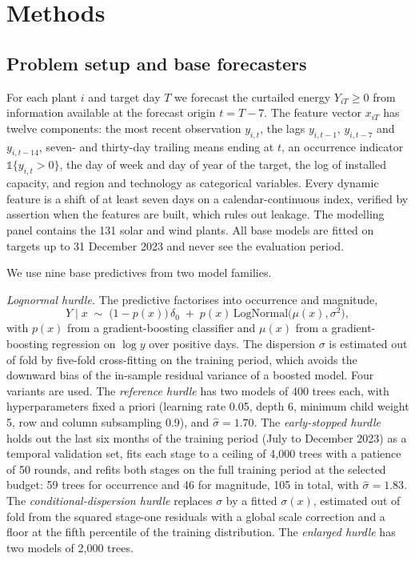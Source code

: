 

\section{Methods}
\label{sec:methods}

\subsection{Problem setup and base forecasters}
\label{sec:base}

For each plant $i$ and target day $T$ we forecast the curtailed energy $Y_{iT}\ge 0$ from information available at the forecast origin $t=T-7$. The feature vector $x_{iT}$ has twelve components: the most recent observation $y_{i,t}$, the lags $y_{i,t-1}$, $y_{i,t-7}$ and $y_{i,t-14}$, seven- and thirty-day trailing means ending at $t$, an occurrence indicator $\mathbb{1}\{y_{i,t}>0\}$, the day of week and day of year of the target, the log of installed capacity, and region and technology as categorical variables. Every dynamic feature is a shift of at least seven days on a calendar-continuous index, verified by assertion when the features are built, which rules out leakage. The modelling panel contains the 131 solar and wind plants. All base models are fitted on targets up to 31 December 2023 and never see the evaluation period.

We use nine base predictives from two model families.

\emph{Lognormal hurdle.} The predictive factorises into occurrence and magnitude,
\begin{equation}
Y \mid x \;\sim\; \big(1-p(x)\big)\,\delta_0 \;+\; p(x)\,\mathrm{LogNormal}\big(\mu(x),\sigma^2\big),
\label{eq:hurdle}
\end{equation}
with $p(x)$ from a gradient-boosting classifier and $\mu(x)$ from a gradient-boosting regression on $\log y$ over positive days. The dispersion $\sigma$ is estimated out of fold by five-fold cross-fitting on the training period, which avoids the downward bias of the in-sample residual variance of a boosted model. Four variants are used. The \emph{reference hurdle} has two models of 400 trees each, with hyperparameters fixed a priori (learning rate 0.05, depth 6, minimum child weight 5, row and column subsampling 0.9), and $\hat\sigma=1.70$. The \emph{early-stopped hurdle} holds out the last six months of the training period (July to December 2023) as a temporal validation set, fits each stage to a ceiling of 4{,}000 trees with a patience of 50 rounds, and refits both stages on the full training period at the selected budget: 59 trees for occurrence and 46 for magnitude, 105 in total, with $\hat\sigma=1.83$. The \emph{conditional-dispersion hurdle} replaces $\sigma$ by a fitted $\sigma(x)$, estimated out of fold from the squared stage-one residuals with a global scale correction and a floor at the fifth percentile of the training distribution. The \emph{enlarged hurdle} has two models of 2{,}000 trees.

